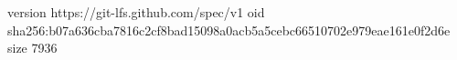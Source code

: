 version https://git-lfs.github.com/spec/v1
oid sha256:b07a636cba7816c2cf8bad15098a0acb5a5cebc66510702e979eae161e0f2d6e
size 7936
